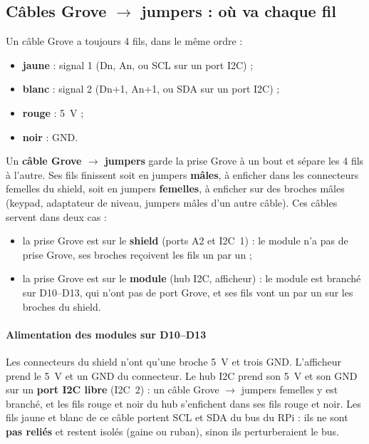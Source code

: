 \documentclass[11pt,a4paper]{article}
\begin{document}
\subsection{Câbles Grove \texorpdfstring{$\to$}{-} jumpers : où va chaque fil}
\label{sec:jumpers}

Un câble Grove a toujours 4 fils, dans le même ordre :

\begin{itemize}
  \item \textbf{jaune} : signal 1 (Dn, An, ou SCL sur un port I2C) ;
  \item \textbf{blanc} : signal 2 (Dn+1, An+1, ou SDA sur un port I2C) ;
  \item \textbf{rouge} : 5~V ;
  \item \textbf{noir} : GND.
\end{itemize}

Un \textbf{câble Grove $\to$ jumpers} garde la prise Grove à un bout et sépare les 4 fils à l'autre. Ses fils finissent soit en jumpers \textbf{mâles}, à enficher dans les connecteurs femelles du shield, soit en jumpers \textbf{femelles}, à enficher sur des broches mâles (keypad, adaptateur de niveau, jumpers mâles d'un autre câble). Ces câbles servent dans deux cas :

\begin{itemize}
  \item la prise Grove est sur le \textbf{shield} (ports A2 et I2C~1) : le module n'a pas de prise Grove, ses broches reçoivent les fils un par un ;
  \item la prise Grove est sur le \textbf{module} (hub I2C, afficheur) : le module est branché sur D10--D13, qui n'ont pas de port Grove, et ses fils vont un par un sur les broches du shield.
\end{itemize}

\paragraph{Alimentation des modules sur D10--D13} Les connecteurs du shield n'ont qu'une broche 5~V et trois GND. L'afficheur prend le 5~V et un GND du connecteur. Le hub I2C prend son 5~V et son GND sur un \textbf{port I2C libre} (I2C~2) : un câble Grove $\to$ jumpers femelles y est branché, et les fils rouge et noir du hub s'enfichent dans ses fils rouge et noir. Les fils jaune et blanc de ce câble portent SCL et SDA du bus du RPi : ils ne sont \textbf{pas reliés} et restent isolés (gaine ou ruban), sinon ils perturberaient le bus.
\end{document}
